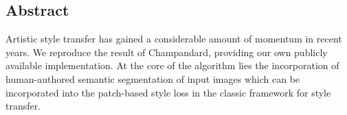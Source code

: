 
\vspace{0.5cm}

\begin{center}
  \begin{minipage}{0.8\textwidth}

    \section*{Abstract}
    \label{section:abstract}

    Artistic style transfer has gained a considerable amount of momentum in recent years. We reproduce the result of Champandard, providing our own publicly available implementation. At the core of the algorithm lies the incorporation of human-authored semantic segmentation of input images which can be incorporated into the patch-based style loss in the classic framework for style transfer. 

  \end{minipage}
\end{center}

\newpage
